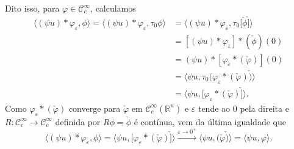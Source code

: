 \documentclass[../distribution_theory_notes.tex]{subfiles}
\begin{document}
\begin{proof*}
	Dito isso, para \(\varphi \in \mathcal{C}_{c}^{\infty}\), calculamos
	\begin{align*}
		\langle (\psi u)*\varphi_{\varepsilon }, \phi \rangle = \langle (\psi u)*\varphi_{\varepsilon }, \tau_{0}\phi \rangle & = \langle (\psi u)*\varphi_{\varepsilon }, \tau_{0}[\check{\phi}\check{]} \rangle     \\
		                                                                                                                      & = [(\psi u)*\varphi_{\varepsilon }]*(\check{\phi})(0)                                 \\
		                                                                                                                      & = (\psi u)*[\varphi_{\varepsilon }*(\check{\varphi })](0)                             \\
		                                                                                                                      & = \langle \psi u, \tau_{0}(\varphi_{\varepsilon }*(\check{\varphi })\check{)} \rangle \\
		                                                                                                                      & = \langle \psi u, [\varphi_{\varepsilon }*(\check{\varphi })\check{]} \rangle.
	\end{align*}
	Como \(\varphi_{\varepsilon }*(\check{\varphi })\) converge para \(\check{\varphi }\) em \(\mathcal{C}_{c}^{\infty}(\mathbb{R}^{n})\) e \(\varepsilon \) tende ao 0 pela direita e \(R:\mathcal{C}_{c}^{\infty}\rightarrow \mathcal{C}_{c}^{\infty}\) definida por \(R\phi = \check{\phi}\) é contínua, vem da última igualdade que
	\[
		\langle (\psi u)*\varphi_{\varepsilon }, \phi \rangle = \langle \psi u, [\varphi_{\varepsilon }*(\check{\varphi })\check{]} \rangle\stackrel{\varepsilon \to 0^{+}}\rightarrow  \langle \psi u, (\check{\varphi }\check{)}  \rangle = \langle \psi u, \varphi  \rangle.
	\]


\end{proof*}
\end{document}
